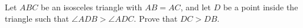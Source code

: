 Let $ABC$ be an isosceles triangle with $AB=AC$, and let $D$ be a point inside the triangle such that $\angle ADB>\angle ADC$. Prove that $DC>DB$.
